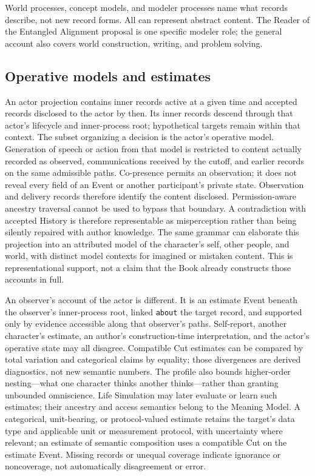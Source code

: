 \documentclass[11pt,a4paper]{article}
\begin{document}
World processes, concept models, and modeler processes name what records
describe, not new record forms. All can represent abstract content. The Reader of the Entangled Alignment proposal
\cite{westerbergEntangled2026} is one specific modeler role;
the general account also covers world construction, writing, and problem solving.

\subsection{Operative models and estimates}
\label{sec:operative-models}

An actor projection contains inner records active at a given time and accepted
records disclosed to the actor by then. Its inner records descend through that
actor's lifecycle and inner-process root; hypothetical targets remain within
that context. The subset organizing a decision is the actor's operative model.
Generation of speech or action
from that model is restricted to content actually recorded as observed,
communications received by the cutoff, and earlier records on the same
admissible paths. Co-presence permits an observation; it does not reveal every
field of an Event or another participant's private state. Observation and
delivery records therefore identify the content disclosed. Permission-aware
ancestry traversal cannot be used to bypass that boundary. A
contradiction with accepted History is therefore representable as
misperception rather than being silently repaired with author knowledge.
The same grammar can elaborate this projection into an attributed model of the
character's self, other people, and world, with distinct model contexts for
imagined or mistaken content. This is representational support, not a claim
that the Book already constructs those accounts in full.

An observer's account of the actor is different. It is an estimate Event beneath
the observer's inner-process root, linked \texttt{about} the target record, and
supported only by evidence accessible along that observer's paths. Self-report,
another character's estimate, an author's construction-time interpretation,
and the actor's operative state may all disagree. Compatible Cut estimates can
be compared by total variation and categorical claims by equality; those
divergences are derived diagnostics, not new semantic numbers. The profile also
bounds higher-order nesting---what one character thinks another thinks---rather
than granting unbounded omniscience. Life Simulation may later evaluate or
learn such estimates; their ancestry and access semantics belong to the Meaning
Model. A categorical, unit-bearing, or protocol-valued estimate retains the
target's data type and applicable unit or measurement protocol, with uncertainty
where relevant; an estimate of semantic composition uses a compatible Cut on the
estimate Event. Missing records or unequal coverage indicate ignorance or
noncoverage, not automatically disagreement or error.
\end{document}

